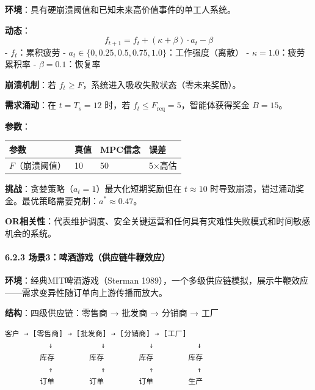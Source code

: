 \documentclass[UTF8]{ctexart}
\let\oldparagraph\paragraph
\renewcommand{\paragraph}[1]{\oldparagraph{#1}\mbox{}}
\begin{document}
\textbf{环境}：具有硬崩溃阈值和已知未来高价值事件的单工人系统。

\textbf{动态}： \[f_{t+1} = f_t + (\kappa + \beta) \cdot a_t - \beta\] -
\(f_t\)：累积疲劳 -
\(a_t \in \{0, 0.25, 0.5, 0.75, 1.0\}\)：工作强度（离散） -
\(\kappa = 1.0\)：疲劳累积率 - \(\beta = 0.1\)：恢复率

\textbf{崩溃机制}：若
\(f_t \geq F\)，系统进入吸收失败状态（零未来奖励）。

\textbf{需求涌动}：在 \(t = T_s = 12\) 时，若
\(f_t \leq F_{\text{req}} = 5\)，智能体获得奖金 \(B = 15\)。

\textbf{参数}：

\begin{table}[h]
\centering
\begin{tabular}{p{3.5cm}p{2.5cm}p{2.5cm}p{4cm}}
\toprule
\textbf{参数} & \textbf{真值} & \textbf{MPC信念} & \textbf{误差} \\
\midrule
\(F\)（崩溃阈值） & 10 & 50 & 5×高估 \\
\bottomrule
\end{tabular}
\end{table}

\textbf{挑战}：贪婪策略（\(a_t = 1\)）最大化短期奖励但在
\(t \approx 10\)
时导致崩溃，错过涌动奖金。最优策略需要克制：\(a^* \approx 0.47\)。

\textbf{OR相关性}：代表维护调度、安全关键运营和任何具有灾难性失败模式和时间敏感机会的系统。

\hypertarget{ux573aux666f3ux5564ux9152ux6e38ux620fux4f9bux5e94ux94feux725bux97adux6548ux5e94}{%
\paragraph{6.2.3
场景3：啤酒游戏（供应链牛鞭效应）}\label{ux573aux666f3ux5564ux9152ux6e38ux620fux4f9bux5e94ux94feux725bux97adux6548ux5e94}}

\textbf{环境}：经典MIT啤酒游戏（Sterman
1989），一个多级供应链模拟，展示牛鞭效应------需求变异性随订单向上游传播而放大。

\textbf{结构}：四级供应链：零售商 → 批发商 → 分销商 → 工厂

\begin{verbatim}
客户 → [零售商] → [批发商] → [分销商] → [工厂]
          ↓           ↓          ↓          ↓
        库存        库存        库存        库存
          ↑           ↑          ↑          ↑
        订单        订单        订单        生产
\end{verbatim}
\end{document}
